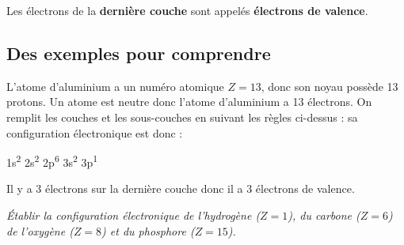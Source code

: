 \documentclass[12pt,a4paper]{article}
\begin{document}
Les électrons de la \textbf{dernière couche} sont appelés \textbf{électrons de valence}.

\subsection{Des exemples pour comprendre}

\begin{multicols}{2}
L'atome d'aluminium a un numéro atomique $Z = 13$, donc son noyau possède 13 protons.
Un atome est neutre donc l'atome d'aluminium a 13 électrons.
On remplit les couches et les sous-couches en suivant les règles ci-dessus : sa configuration électronique est donc :
\begin{center}
\textcolor{red_f}{1s}\textsuperscript{2} \textcolor{green_f}{2s}\textsuperscript{2} \textcolor{green_f}{2p}\textsuperscript{6} \textcolor{bleu_f}{3s}\textsuperscript{2} \textcolor{bleu_f}{3p}\textsuperscript{1}
\end{center}
Il y a 3 électrons sur la dernière couche donc il a 3 électrons de valence.


\center
{}
\end{multicols}

\emph{Établir la configuration électronique de l'hydrogène ($Z=1$), du carbone ($Z=6$) de l'oxygène ($Z=8$) et du phosphore ($Z=15$).}
\end{document}
